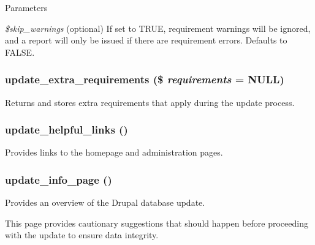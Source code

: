 \begin{DoxyParams}{Parameters}
\item[{\em \$skip\_\-warnings}](optional) If set to TRUE, requirement warnings will be ignored, and a report will only be issued if there are requirement errors. Defaults to FALSE. \end{DoxyParams}
\hypertarget{update_8php_a0c14cba656eed6f94996df5798223b9a}{
\subsubsection[{update\_\-extra\_\-requirements}]{\setlength{\rightskip}{0pt plus 5cm}update\_\-extra\_\-requirements (\$ {\em requirements} = {\ttfamily NULL})}}
\label{update_8php_a0c14cba656eed6f94996df5798223b9a}
Returns and stores extra requirements that apply during the update process. \hypertarget{update_8php_a8f2fcde5a819a7ddab954d2db972caa4}{
\subsubsection[{update\_\-helpful\_\-links}]{\setlength{\rightskip}{0pt plus 5cm}update\_\-helpful\_\-links ()}}
\label{update_8php_a8f2fcde5a819a7ddab954d2db972caa4}
Provides links to the homepage and administration pages. \hypertarget{update_8php_a1c9b293ee11117ef8911b52809e75bde}{
\subsubsection[{update\_\-info\_\-page}]{\setlength{\rightskip}{0pt plus 5cm}update\_\-info\_\-page ()}}
\label{update_8php_a1c9b293ee11117ef8911b52809e75bde}
Provides an overview of the Drupal database update.

This page provides cautionary suggestions that should happen before proceeding with the update to ensure data integrity.

